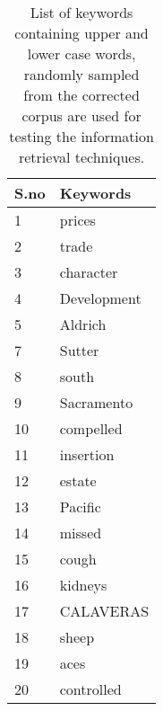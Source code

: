 \documentclass{sig-alternate}
\begin{document}
%
%
%
%
%

\appendix
\begin{table*}[th]
\centering
\begin{tabular}{| l | l |}
\hline
 S.no  & Keywords\\
\hline
1 & prices\\
2 & trade \\
3 & character \\
4 & Development \\
5 & Aldrich \\
7 & Sutter \\
8 & south \\
9 & Sacramento \\
10 & compelled \\
11 & insertion \\
12 & estate \\
13 & Pacific \\
14 & missed \\
15 & cough \\
16 & kidneys \\
17 & CALAVERAS \\
18 & sheep \\
19 & aces \\
20 & controlled \\
\hline
\end{tabular}
\caption{List of keywords containing upper and lower case words, randomly sampled from the corrected corpus are used for testing the information retrieval techniques.}
\label{table:keywords}
\end{table*}
\end{document}
